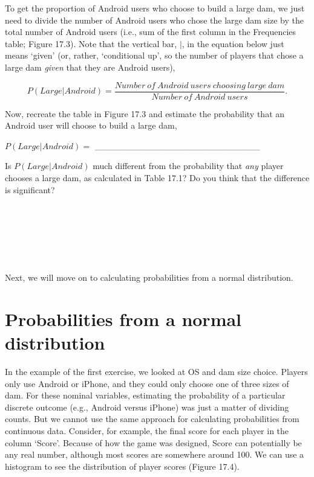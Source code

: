 \documentclass[
]{scrbook}
\begin{document}
To get the proportion of Android users who choose to build a large dam, we just need to divide the number of Android users who chose the large dam size by the total number of Android users (i.e., sum of the first column in the Frequencies table; Figure 17.3).
Note that the vertical bar, \(|\), in the equation below just means `given' (or, rather, `conditional up', so the number of players that chose a large dam \emph{given} that they are Android users),

\[P(Large | Android) = \frac{Number\:of\:Android\:users\:choosing\:large\:dam}{Number\:of\:Android\:users}.\]

Now, recreate the table in Figure 17.3 and estimate the probability that an Android user will choose to build a large dam,

\(P(Large | Android) =\) \_\_\_\_\_\_\_\_\_\_\_\_\_\_\_\_\_\_\_\_\_\_\_\_\_\_

Is \(P(Large | Android)\) much different from the probability that \emph{any} player chooses a large dam, as calculated in Table 17.1? Do you think that the difference is significant?

\begin{verbatim}






\end{verbatim}

Next, we will move on to calculating probabilities from a normal distribution.

\hypertarget{probabilities-from-a-normal-distribution}{%
\section{Probabilities from a normal distribution}\label{probabilities-from-a-normal-distribution}}

In the example of the first exercise, we looked at OS and dam size choice.
Players only use Android or iPhone, and they could only choose one of three sizes of dam.
For these nominal variables, estimating the probability of a particular discrete outcome (e.g., Android versus iPhone) was just a matter of dividing counts.
But we cannot use the same approach for calculating probabilities from continuous data.
Consider, for example, the final score for each player in the column `Score'.
Because of how the game was designed, Score can potentially be any real number, although most scores are somewhere around 100.
We can use a histogram to see the distribution of player scores (Figure 17.4).
\end{document}
